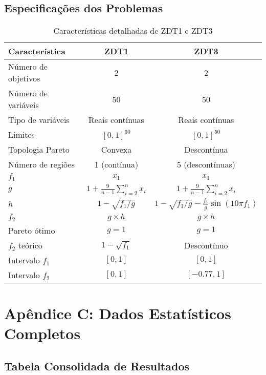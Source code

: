 \subsection{Especificações dos Problemas}

\begin{table}[H]
\centering
\caption{Características detalhadas de ZDT1 e ZDT3}
\begin{tabular}{@{}lcc@{}}
\toprule
\textbf{Característica} & \textbf{ZDT1} & \textbf{ZDT3} \\
\midrule
Número de objetivos & 2 & 2 \\
Número de variáveis & 50 & 50 \\
Tipo de variáveis & Reais contínuas & Reais contínuas \\
Limites & $[0, 1]^{50}$ & $[0, 1]^{50}$ \\
\midrule
Topologia Pareto & Convexa & Descontínua \\
Número de regiões & 1 (contínua) & 5 (descontínuas) \\
\midrule
$f_1$ & $x_1$ & $x_1$ \\
$g$ & $1 + \frac{9}{n-1}\sum_{i=2}^{n}x_i$ & $1 + \frac{9}{n-1}\sum_{i=2}^{n}x_i$ \\
$h$ & $1 - \sqrt{f_1/g}$ & $1 - \sqrt{f_1/g} - \frac{f_1}{g}\sin(10\pi f_1)$ \\
$f_2$ & $g \times h$ & $g \times h$ \\
\midrule
Pareto ótimo & $g = 1$ & $g = 1$ \\
$f_2$ teórico & $1 - \sqrt{f_1}$ & Descontínuo \\
Intervalo $f_1$ & $[0, 1]$ & $[0, 1]$ \\
Intervalo $f_2$ & $[0, 1]$ & $[-0.77, 1]$ \\
\bottomrule
\end{tabular}
\end{table}

\section{Apêndice C: Dados Estatísticos Completos}

\subsection{Tabela Consolidada de Resultados}

